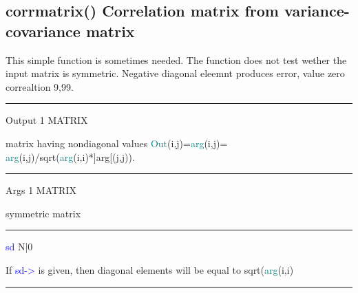\subsection{\textcolor{VioletRed}{corrmatrix}() Correlation matrix from variance-covariance matrix}
\label{corrmatrix}
This simple function is sometimes needed. The function does not test wether the input matrix is symmetric.
Negative diagonal eleemnt produces error, value zero correaltion 9,99.
\vspace{0.3cm}
\hrule
\vspace{0.3cm}
\noindent Output \tabto{3cm}  1 \tabto{5cm}   MATRIX \tabto{7cm}
\begin{changemargin}{3cm}{0cm}
\noindent  matrix having nondiagonal values \textcolor{teal}{Out}(i,j)=\textcolor{teal}{arg}(i,j)=
\textcolor{teal}{arg}(i,j)/\textcolor{VioletRed}{sqrt}(\textcolor{teal}{arg}(i,i)*]arg[(j,j)).
\end{changemargin}
\vspace{0.3cm}
\hrule
\vspace{0.3cm}
\noindent Args  \tabto{3cm} 1 \tabto{5cm}   MATRIX \tabto{7cm}
\begin{changemargin}{3cm}{0cm}
\noindent  symmetric matrix
\end{changemargin}
\vspace{0.3cm}
\hrule
\vspace{0.3cm}
\noindent \textcolor{blue}{sd} \tabto{3cm} N|0  \tabto{5cm}    \tabto{7cm}
\begin{changemargin}{3cm}{0cm}
\noindent If \textcolor{blue}{sd->} is given, then diagonal elements will be equal to \textcolor{VioletRed}{sqrt}(\textcolor{teal}{arg}(i,i)
\end {changemargin}
\hrule
\vspace{0.2cm}
